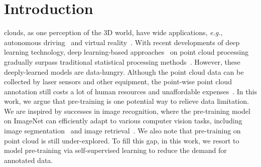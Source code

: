 \documentclass[journal]{IEEEtran}
\def\eg{\emph{e.g.}}
\begin{document}
\section{Introduction}
 clouds, as one perception of the 3D world, have wide applications, \eg, autonomous driving~\cite{cui2021deep, li2020deep, tampuu2020survey} and virtual reality~\cite{guo2020deep}. With recent developments of deep learning technology, deep learning-based approaches~\cite{wan2021rgb, chen2020boost, wang2018pixel2mesh, hu2021learning} on point cloud processing gradually surpass traditional statistical processing methods~\cite{guo2020deep, huang2021comprehensive}. 
However, these deeply-learned models are data-hungry. Although the point cloud data can be collected by laser sensors and other equipment, the point-wise point cloud annotation still costs a lot of human resources and unaffordable expenses~\cite{wu20153d, yi2016scalable, armeni2017joint, dai2017scannet}. In this work, we argue that pre-training is one potential way to relieve data limitation. We are inspired by successes in image recognition, where the pre-training model on ImageNet can efficiently adapt to various computer vision tasks, including image segmentation~\cite{2015U, long2015fully, 2016Pyramid, 2018Encoder} and image retrieval~\cite{2016Deep, 2017Large, 2017Unlabeled, zhang2019deep,zheng2020vehiclenet}. We also note that pre-training on point cloud is still under-explored. 
To fill this gap, in this work, we resort to model pre-training via self-supervised learning to reduce the demand for annotated data. 
\end{document}

